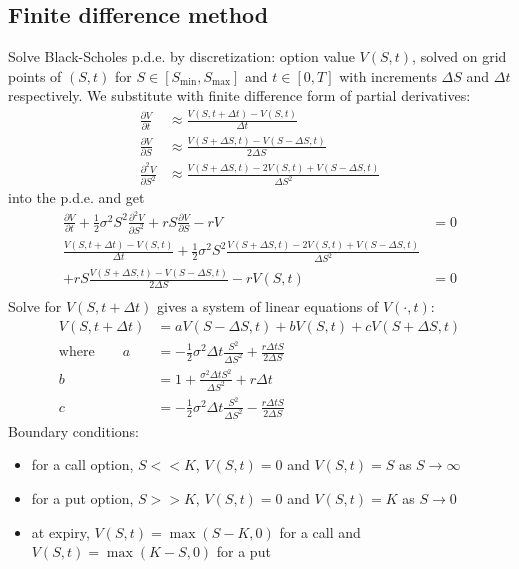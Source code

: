 \documentclass[9pt,twocolumn]{extarticle}
\begin{document}
\subsection*{Finite difference method}

Solve Black-Scholes p.d.e. by discretization: option value $V(S,t)$, solved on
grid points of $(S,t)$ for $S\in[S_{\min},S_{\max}]$ and $t\in[0,T]$ with
increments $\Delta S$ and $\Delta t$ respectively. We substitute with finite
difference form of partial derivatives:
\begin{align*}
\frac{\partial V}{\partial t} & \approx \frac{V(S,t+\Delta t)-V(S,t)}{\Delta t} \\
\frac{\partial V}{\partial S} & \approx \frac{V(S+\Delta S,t)-V(S-\Delta S,t)}{2\Delta S} \\
\frac{\partial^2 V}{\partial S^2} & \approx \frac{V(S+\Delta S,t) - 2V(S,t) + V(S-\Delta S,t)}{\Delta S^2}
\end{align*}
into the p.d.e. and get
\begin{align*}
\frac{\partial V}{\partial t} +
\frac{1}{2}\sigma^2S^2\frac{\partial^2V}{\partial S^2}+
rS\frac{\partial V}{\partial S}-
rV &= 0 \\
\frac{V(S,t+\Delta t)-V(S,t)}{\Delta t} + 
\frac{1}{2}\sigma^2S^2\frac{V(S+\Delta S,t)-2V(S,t)+V(S-\Delta S,t)}{\Delta S^2} & \\ + 
rS\frac{V(S+\Delta S,t)-V(S-\Delta S,t)}{2\Delta S}-rV(S,t) &= 0 \\
\end{align*}
Solve for $V(S,t+\Delta t)$ gives a system of linear equations of $V(\cdot,t)$:
\begin{align*}
V(S,t+\Delta t) &= a V(S-\Delta S,t) + b V(S,t) + c V(S+\Delta S,t) \\
\textrm{where}\qquad
a &= -\frac{1}{2}\sigma^2\Delta t\frac{S^2}{\Delta S^2} + \frac{r\Delta t S}{2\Delta S} \\
b &= 1+\frac{\sigma^2\Delta t S^2}{\Delta S^2} + r\Delta t \\
c &= -\frac{1}{2}\sigma^2\Delta t\frac{S^2}{\Delta S^2} - \frac{r\Delta t S}{2\Delta S}
\end{align*}
Boundary conditions:
\begin{itemize}
\item for a call option, $S << K$, $V(S,t)=0$ and $V(S,t)=S$ as $S\to\infty$
\item for a put option, $S >> K$, $V(S,t)=0$ and $V(S,t)=K$ as $S\to 0$
\item at expiry, $V(S,t)=\max(S-K,0)$ for a call and $V(S,t)=\max(K-S,0)$ for a put
\end{itemize}
\end{document}
